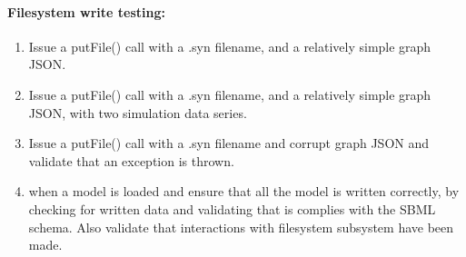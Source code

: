 \paragraph{Filesystem write testing:}

\begin{enumerate}
\item Issue a putFile() call with a .syn filename, and a relatively simple graph JSON.
\item  Issue a putFile() call with a .syn filename, and a  relatively simple graph JSON, with two simulation data series.
\item  Issue a putFile() call with a .syn filename and corrupt graph JSON and validate that an exception is thrown. 
\item when a model is loaded and ensure that all the model is written correctly, by checking for written data and validating that is complies with the SBML schema. Also validate that interactions with filesystem subsystem have been made.
\end{enumerate}

